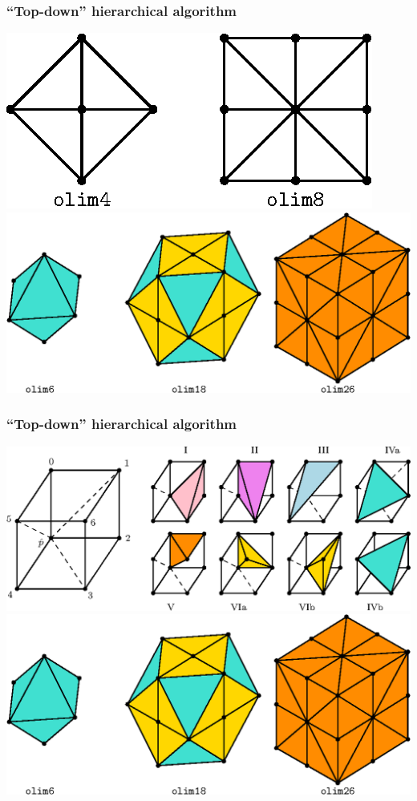 \documentclass{beamer}
\begin{document}
\begin{frame}
  \frametitle{``Top-down'' hierarchical algorithm}
  \centering
  \includegraphics{neighborhood-2d.eps}
  \includegraphics[width=\linewidth]{neighborhood-3d.eps}
\end{frame}

\begin{frame} %
  \frametitle{``Top-down'' hierarchical algorithm}
  \centering
  \includegraphics[width=0.65\linewidth]{simplex-groups.eps}
  \includegraphics[width=\linewidth]{neighborhood-3d.eps}
\end{frame}
\end{document}
